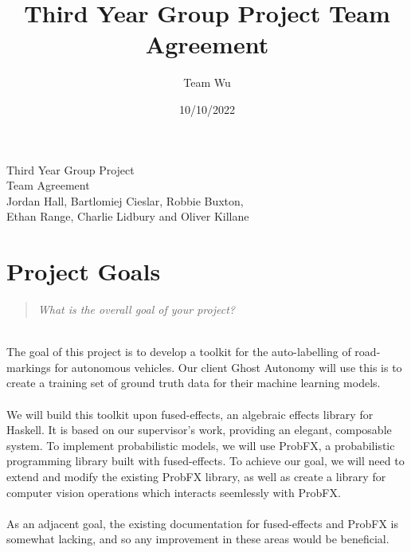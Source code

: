 \documentclass{report}
\title{Third Year Group Project Team Agreement}
\author{Team Wu}
\date{10/10/2022}
\newcommand{\teamq}[1]{\begin{quote}
    \large\textit{#1}
\end{quote}}
\begin{document}
\begin{titlepage}
    
    \vspace{2cm}
    \begin{flushright}
        \modulecodefont Third Year Group Project \\
        \vspace{4mm}
        \ostitlefont Team Agreement \\
        \vspace{2mm}
        \imperialfont Jordan Hall, Bartlomiej Cieslar, Robbie Buxton, 
        \\ \vspace{1mm}
        Ethan Range, Charlie Lidbury and Oliver Killane
    \end{flushright}
\end{titlepage}

\pagebreak

\section*{Project Goals}
\teamq{What is the overall goal of your project?}
\\
The goal of this project is to develop a toolkit for the auto-labelling of road-markings for autonomous vehicles. Our client Ghost Autonomy will use this is to create a training set of ground truth data for their machine learning models. 
\\
\\We will build this toolkit upon fused-effects, an algebraic effects library for Haskell. It is based on our supervisor's work, providing an elegant, composable system. To implement probabilistic models, we will use ProbFX, a probabilistic programming library built with fused-effects. To achieve our goal, we will need to extend and modify the existing ProbFX library, as well as create a library for computer vision operations which interacts seemlessly with ProbFX.
\\
\\As an adjacent goal, the existing documentation for fused-effects and ProbFX is somewhat lacking, and so any improvement in these areas would be beneficial.
\end{document}
